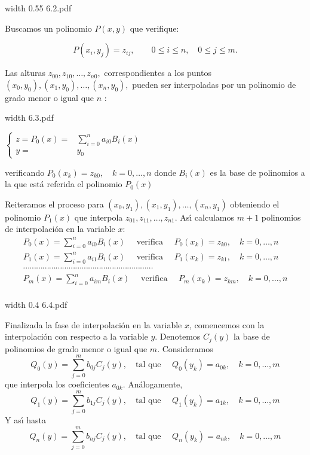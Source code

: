 \documentclass[twoside]{report}
\newcommand{\colocapdf}[2]{\quad\pdfimage width #2 {#1.pdf}}
\begin{document}
\begin{center}
\colocapdf{6.2}{0.55\textwidth}
\end{center}

Buscamos un polinomio $P(x,y)$ que verifique:

$$P(x_i,y_j)=z_{ij},\quad \quad 0\leq i\leq n,\quad 0\leq j\leq
m.$$

Las alturas $z_{00},z_{10},\ldots,z_{n0},$ correspondientes a los puntos $(x_0,y_0),(x_1,y_0),\ldots,(x_n,y_0),$ pueden ser interpoladas por un polinomio de grado menor o igual que $n$ :

\begin{minipage}{.35\textwidth}\colocapdf{6.3}{\textwidth}
\end{minipage} \quad \quad \quad
\begin{minipage}{.4\textwidth} $\left\{ \begin{array}{rl}
z=P_0(x)=&\sum_{i=0}^n a_{i0} B_i(x)\\
y=&y_0 \end{array} \right.$
\end{minipage}

verificando $P_0(x_k)=z_{k0}, \quad k=0,\ldots,n$ donde $B_i(x)$ es la base de polinomios a la que est\'{a} referida el polinomio $P_0(x)$

Reiteramos el proceso para $(x_0,y_1),(x_1,y_1),\ldots,(x_n,y_1)$ obteniendo el polinomio $P_1(x)$ que interpola $z_{01},z_{11},\ldots,z_{n1}.$ As\'{\i} calculamos $m+1$ polinomios de interpolaci\'{o}n en la variable $x$:
$$\begin{array}{c}
P_0(x)=\sum_{i=0}^n a_{i0} B_i(x) \quad \mbox{ verifica } \quad
P_0(x_k)=z_{k0}, \quad k=0,\ldots,n \\
P_1(x)=\sum_{i=0}^n a_{i1} B_i(x) \quad \mbox{ verifica } \quad
P_1(x_k)=z_{k1}, \quad k=0,\ldots,n \\
\cdots \cdots \cdots \cdots \cdots \cdots \cdots \cdots \cdots \cdots \cdots \cdots \cdots \cdots \cdots \cdots \cdots \cdots \cdots \cdots\\
P_m(x)=\sum_{i=0}^n a_{im} B_i(x) \quad \mbox{ verifica } \quad
P_m(x_k)=z_{km}, \quad k=0,\ldots,n \\
\end{array}$$
\begin{center}
\colocapdf{6.4}{0.4\textwidth}
\end{center}

Finalizada la fase de interpolaci\'{o}n en la variable $x$, comencemos con la interpolaci\'{o}n con respecto a la variable $y$. Denotemos $C_j(y)$ la base de polinomios de grado menor o igual que $m$. Consideramos
$$Q_0(y)=\sum_{j=0}^m b_{0j}C_j(y),\quad  \mbox{tal que }\quad Q_0(y_k)=a_{0k},\quad k=0,\ldots,m$$
que interpola los coeficientes $a_{0k}$. An\'{a}logamente,
$$Q_1(y)=\sum_{j=0}^m b_{1j}C_j(y),\quad \mbox{tal que }\quad Q_1(y_k)=a_{1k},\quad k=0,\ldots,m$$
Y as\'{\i} hasta
$$Q_n(y)=\sum_{j=0}^m b_{nj}C_j(y),\quad \mbox{tal que }\quad
    Q_n(y_k)=a_{nk},\quad k=0,\ldots,m$$
\end{document}
